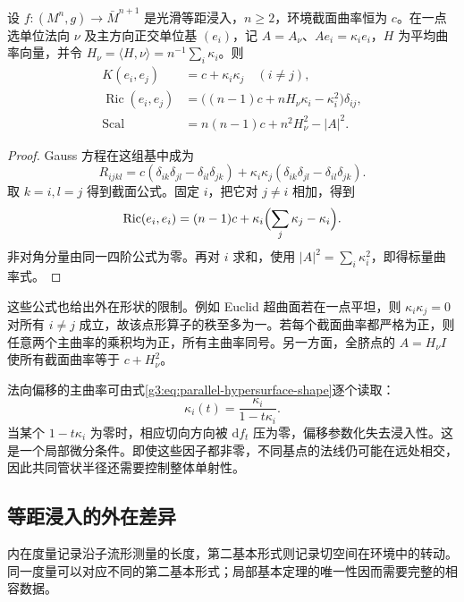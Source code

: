 \begin{proposition}\label{g3:prop:principal-curvature-contractions}
	设 \(f:(M^n,g)\to\bar M^{n+1}\) 是光滑等距浸入，\(n\ge2\)，环境截面曲率恒为 \(c\)。在一点选单位法向 \(\nu\) 及主方向正交单位基 \((e_i)\)，记 \(A=A_\nu\)、\(A e_i=\kappa_i e_i\)，\(H\) 为平均曲率向量，并令 \(H_\nu=\langle H,\nu\rangle=n^{-1}\sum_i\kappa_i\)。则
	\begin{align}
		K(e_i,e_j)&=c+\kappa_i\kappa_j\quad(i\ne j),\label{g3:eq:principal-sectional-curvature}\\
		\operatorname{Ric}(e_i,e_j)
		&=\bigl((n-1)c+nH_\nu\kappa_i-\kappa_i^2\bigr)\delta_{ij},\label{g3:eq:principal-ricci-curvature}\\
		\operatorname{Scal}
		&=n(n-1)c+n^2H_\nu^2-|A|^2.\label{g3:eq:hypersurface-scalar-curvature}
	\end{align}
\end{proposition}
\begin{proof}
	Gauss 方程在这组基中成为
	\[
		R_{ijkl}
		=c(\delta_{ik}\delta_{jl}-\delta_{il}\delta_{jk})
		+\kappa_i\kappa_j(\delta_{ik}\delta_{jl}-\delta_{il}\delta_{jk}).
	\]
	取 \(k=i,l=j\) 得到截面公式。固定 \(i\)，把它对 \(j\ne i\) 相加，得到
	\[
		\operatorname{Ric}(e_i,e_i)
		=(n-1)c+\kappa_i\Bigl(\sum_j\kappa_j-\kappa_i\Bigr).
	\]
	非对角分量由同一四阶公式为零。再对 \(i\) 求和，使用 \(|A|^2=\sum_i\kappa_i^2\)，即得标量曲率式。
\end{proof}

这些公式也给出外在形状的限制。例如 Euclid 超曲面若在一点平坦，则 \(\kappa_i\kappa_j=0\) 对所有 \(i\ne j\) 成立，故该点形算子的秩至多为一。若每个截面曲率都严格为正，则任意两个主曲率的乘积均为正，所有主曲率同号。另一方面，全脐点的 \(A=H_\nu I\) 使所有截面曲率等于 \(c+H_\nu^2\)。

\ProseParagraphBreak

法向偏移的主曲率可由式\eqref{g3:eq:parallel-hypersurface-shape}逐个读取：
\[
	\kappa_i(t)=\frac{\kappa_i}{1-t\kappa_i}.
\]
当某个 \(1-t\kappa_i\) 为零时，相应切向方向被 \(\mathrm df_t\) 压为零，偏移参数化失去浸入性。这是一个局部微分条件。即使这些因子都非零，不同基点的法线仍可能在远处相交，因此共同管状半径还需要控制整体单射性。

\subsection{等距浸入的外在差异}
\label{g3:subsec:0404:03}

内在度量记录沿子流形测量的长度，第二基本形式则记录切空间在环境中的转动。同一度量可以对应不同的第二基本形式；局部基本定理的唯一性因而需要完整的相容数据。


